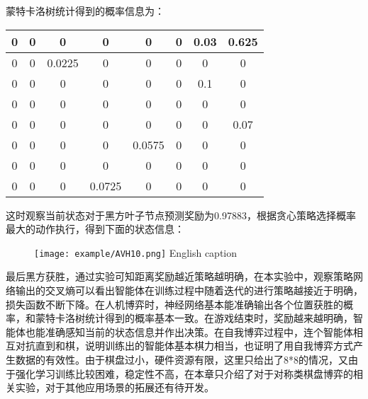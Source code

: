 蒙特卡洛树统计得到的概率信息为：

\begin{tabular}{|c|c|c|c|c|c|c|c|}
	\hline 
	0& 0 & 0 &0  & 0 &0  & 0.03 &0.625  \\ 
	\hline 
	0 & 0 & 0.0225 & 0 & 0 & 0 & 0 & 0 \\ 
	\hline 
	0 & 0 & 0 & 0 & 0 & 0 & 0.1 & 0 \\ 
	\hline 
	0 & 0 & 0 & 0 &0 & 0 & 0 & 0 \\ 
	\hline 
	0 & 0 &0& 0 & 0 & 0 & 0 & 0.07\\ 
	\hline 
	0 & 0 & 0 & 0 & 0.0575 & 0 & 0 & 0 \\ 
	\hline 
	0 & 0 & 0 & 0 & 0 & 0 & 0 & 0 \\ 
	\hline 
	0 & 0 & 0 & 0.0725 & 0 & 0 & 0 & 0 \\ 
	\hline 
\end{tabular}

这时观察当前状态对于黑方叶子节点预测奖励为0.97883，根据贪心策略选择概率最大的动作执行，得到下面的状态信息：

\begin{figure}[!htp]
	\centering
	\texttt{[image: example/AVH10.png]}
	\hspace{0.5cm}
	{English caption}
	\label{fig:human6}
\end{figure}

最后黑方获胜，通过实验可知距离奖励越近策略越明确，在本实验中，观察策略网络输出的交叉熵可以看出智能体在训练过程中随着迭代的进行策略越接近于明确，损失函数不断下降。在人机博弈时，神经网络基本能准确输出各个位置获胜的概率，和蒙特卡洛树统计得到的概率基本一致。在游戏结束时，奖励越来越明确，智能体也能准确感知当前的状态信息并作出决策。在自我博弈过程中，连个智能体相互对抗直到和棋，说明训练出的智能体基本棋力相当，也证明了用自我博弈方式产生数据的有效性。由于棋盘过小，硬件资源有限，这里只给出了8*8的情况，又由于强化学习训练比较困难，稳定性不高，在本章只介绍了对于对称类棋盘博弈的相关实验，对于其他应用场景的拓展还有待开发。
